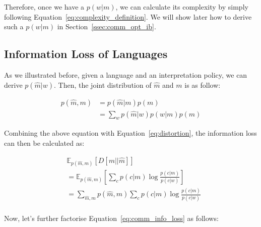 \documentclass[11pt]{article}
\begin{document}
Therefore, once we have a $p(w|m)$, we can calculate its complexity by simply following Equation~\ref{eq:complexity_definition}.
We will show later how to derive such a $p(w|m)$ in Section~\ref{ssec:comm_opt_ib}.

\subsection{Information Loss of Languages}
\label{ssec:lan_info_loss}

As we illustrated before, given a language and an interpretation policy, we can derive $p(\hat{m}|w)$.
Then, the joint distribution of $\hat{m}$ and $m$ is as follow:

\begin{equation}
    \begin{split}
        p(\hat{m},m) 
        & = p(\hat{m}|m)p(m) \\
        & = \sum_w p(\hat{m}|w)p(w|m)p(m)
    \end{split}
    \label{eq:joint_c_hat_c}
\end{equation}

Combining the above equation with Equation~\ref{eq:distortion}, the information loss can then be calculated as:

\begin{equation}
    \begin{split}
        & \mathbb{E}_{p(\hat{m},m)}\left[D[m||\hat{m}]\right] \\
        & = \mathbb{E}_{p(\hat{m},m)}\left[ \sum_{c} p(c|m) \log \frac{p(c|m)}{p(c|w)} \right] \\
        & = \sum_{\hat{m},m} p(\hat{m},m) \sum_{c} p(c|m) \log \frac{p(c|m)}{p(c|w)} \\
    \end{split}
    \label{eq:comm_info_loss}
\end{equation}

Now, let's further factorise Equation~\ref{eq:comm_info_loss} as follows:
\end{document}
